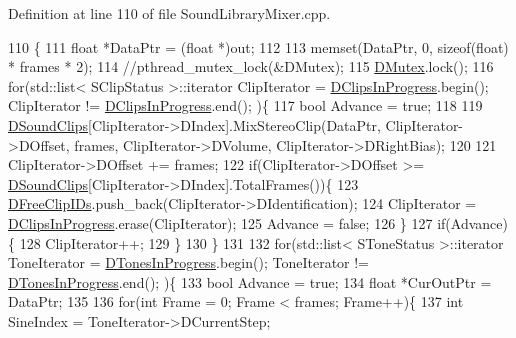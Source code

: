 Definition at line 110 of file Sound\+Library\+Mixer.\+cpp.


\begin{DoxyCode}
110                                                                                                            
                                  \{
111     \textcolor{keywordtype}{float} *DataPtr = (\textcolor{keywordtype}{float} *)out;
112     
113     memset(DataPtr, 0, \textcolor{keyword}{sizeof}(\textcolor{keywordtype}{float}) * frames * 2);
114     \textcolor{comment}{//pthread\_mutex\_lock(&DMutex);}
115     \hyperlink{classCSoundLibraryMixer_a955562a0638df831413a1c6b8860f9fb}{DMutex}.lock();
116     \textcolor{keywordflow}{for}(std::list< SClipStatus >::iterator ClipIterator = \hyperlink{classCSoundLibraryMixer_aad014b54093b2aeee4d7014ab329dbf9}{DClipsInProgress}.begin(); 
      ClipIterator != \hyperlink{classCSoundLibraryMixer_aad014b54093b2aeee4d7014ab329dbf9}{DClipsInProgress}.end(); )\{
117         \textcolor{keywordtype}{bool} Advance = \textcolor{keyword}{true};
118         
119         \hyperlink{classCSoundLibraryMixer_af4a006eacdcd590fad6e02cddaf197c2}{DSoundClips}[ClipIterator->DIndex].MixStereoClip(DataPtr, ClipIterator->DOffset, frames, 
      ClipIterator->DVolume, ClipIterator->DRightBias);
120         
121         ClipIterator->DOffset += frames;
122         \textcolor{keywordflow}{if}(ClipIterator->DOffset >= \hyperlink{classCSoundLibraryMixer_af4a006eacdcd590fad6e02cddaf197c2}{DSoundClips}[ClipIterator->DIndex].TotalFrames())\{
123             \hyperlink{classCSoundLibraryMixer_a32956ae09580a1ae4c9c037f0f7b5c0b}{DFreeClipIDs}.push\_back(ClipIterator->DIdentification);   
124             ClipIterator = \hyperlink{classCSoundLibraryMixer_aad014b54093b2aeee4d7014ab329dbf9}{DClipsInProgress}.erase(ClipIterator);
125             Advance = \textcolor{keyword}{false};
126         \}
127         \textcolor{keywordflow}{if}(Advance)\{
128             ClipIterator++;   
129         \}
130     \}
131     
132     \textcolor{keywordflow}{for}(std::list< SToneStatus >::iterator ToneIterator = \hyperlink{classCSoundLibraryMixer_a39bb9c811d842a282b6b7058ac7dfe1c}{DTonesInProgress}.begin(); 
      ToneIterator != \hyperlink{classCSoundLibraryMixer_a39bb9c811d842a282b6b7058ac7dfe1c}{DTonesInProgress}.end(); )\{
133         \textcolor{keywordtype}{bool} Advance = \textcolor{keyword}{true};
134         \textcolor{keywordtype}{float} *CurOutPtr = DataPtr;
135         
136         \textcolor{keywordflow}{for}(\textcolor{keywordtype}{int} Frame = 0; Frame < frames; Frame++)\{
137             \textcolor{keywordtype}{int} SineIndex = ToneIterator->DCurrentStep;

\end{DoxyCode}
